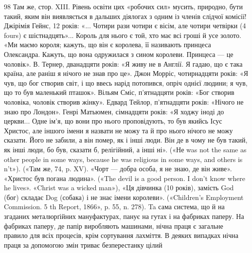 98 Там же, стор. XIII. Рівень освіти цих «робочих сил» мусить, природно,
бути такий, яким він виявляється в дальших діялогах з одним із
членів слідчої комісії! Джірімія Гейнс, 12 років: «... Чотири рази чотири
є вісім, але чотири четвірки (4 fours) є шістнадцять»... Король для
нього є той, хто має всі гроші й усе золото. «Ми маємо короля; кажуть,
що він є королева, її називають принцеса Олександра. Кажуть, що вона
одружилася з сином королеви. Принцеса — це чоловік». В. Тернер,
дванадцяти років: «Я живу не в Англії. Я гадаю, що є така країна, але
раніш я нічого не знав про це». Джон Морріс, чотирнадцяти років: «Я чув,
що бог створив світ, і що ввесь нарід потопився, опріч однієї людини; я
чув, що то був маленький пташок». Вільям Сміс, п’ятнадцяти років:
«Бог створив чоловіка, чоловік створив жінку». Едвард Тейлор, п’ятнадцяти
років: «Нічого не знаю про Лондон». Генрі Матьюмен, сімнадцяти
років: «Я ходжу іноді до церкви... Одне ім’я, що вони про нього проповідують,
то був якийсь Ісус Христос, але іншого імени я назвати не можу
та й про нього нічого не можу сказати. Його не забили, а він помер, як
і інші люди. Він де в чому не був такий, як інші люди, бо був, сказати б,
релігійний, а інші ні». («Не was not the same as other people in some ways,
because he was religious in some ways, and others is n’t»). («Там же, 74,
p. XV). «Чорт — добра особа, я не знаю, де він живе». «Христос був погана
людина». («The devil is a good person. I don’t know where he lives». «Christ
was a wicked man»), «Ця дівчинка (10 років), замість God (бог) складає
Dog (собака) і не знає імени королеви». («Children’s Employment Commission.
5 th Report, 1866», p. 55, n. 278). Ta сама система, що й на згаданих
металюрґійних мануфактурах, панує на гутах і на фабриках паперу.
На фабриках паперу, де папір виробляють машинами, нічна праця
є загальне правило для всіх процесів, крім сортування лахміття. В деяких
випадках нічна праця за допомогою змін триває безперестанку цілий
